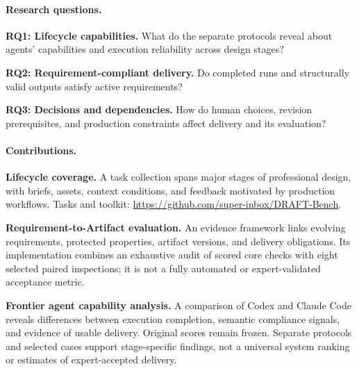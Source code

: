 \paragraph{Research questions.}\mbox{}
\begin{introlist}
\item \textbf{RQ1: Lifecycle capabilities.} What do the separate protocols reveal about agents' capabilities and execution reliability across design stages?
\item \textbf{RQ2: Requirement-compliant delivery.} Do completed runs and structurally valid outputs satisfy active requirements?
\item \textbf{RQ3: Decisions and dependencies.} How do human choices, revision prerequisites, and production constraints affect delivery and its evaluation?
\end{introlist}

\paragraph{Contributions.}\mbox{}
\begin{introlist}
\item \textbf{Lifecycle coverage.} A task collection spans major stages of professional design, with briefs, assets, context conditions, and feedback motivated by production workflows. Tasks and toolkit: \url{https://github.com/super-inbox/DRAFT-Bench}.
\item \textbf{Requirement-to-Artifact evaluation.} An evidence framework links evolving requirements, protected properties, artifact versions, and delivery obligations. Its implementation combines an exhaustive audit of scored core checks with eight selected paired inspections; it is not a fully automated or expert-validated acceptance metric.
\item \textbf{Frontier agent capability analysis.} A comparison of Codex and Claude Code reveals differences between execution completion, semantic compliance signals, and evidence of usable delivery. Original scores remain frozen. Separate protocols and selected cases support stage-specific findings, not a universal system ranking or estimates of expert-accepted delivery.
\end{introlist}
